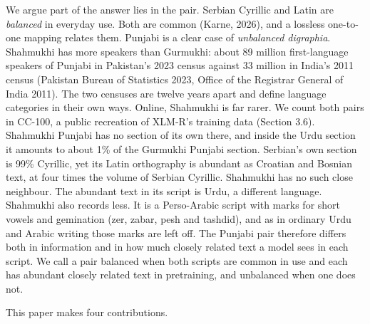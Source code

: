 We argue part of the answer lies in the pair. Serbian Cyrillic and Latin
are \emph{balanced} in everyday use. Both are common (Karne, 2026), and
a lossless one-to-one mapping relates them. Punjabi is a clear case of
\emph{unbalanced digraphia}. Shahmukhi has more speakers than Gurmukhi:
about 89 million first-language speakers of Punjabi in Pakistan's 2023
census against 33 million in India's 2011 census (Pakistan Bureau of
Statistics 2023, Office of the Registrar General of India 2011). The two
censuses are twelve years apart and define language categories in their
own ways. Online, Shahmukhi is far rarer. We count both pairs in CC-100,
a public recreation of XLM-R's training data (Section 3.6). Shahmukhi
Punjabi has no section of its own there, and inside the Urdu section it
amounts to about 1\% of the Gurmukhi Punjabi section. Serbian's own
section is 99\% Cyrillic, yet its Latin orthography is abundant as
Croatian and Bosnian text, at four times the volume of Serbian Cyrillic.
Shahmukhi has no such close neighbour. The abundant text in its script
is Urdu, a different language. Shahmukhi also records less. It is a
Perso-Arabic script with marks for short vowels and gemination (zer,
zabar, pesh and tashdid), and as in ordinary Urdu and Arabic writing
those marks are left off. The Punjabi pair therefore differs both in
information and in how much closely related text a model sees in each
script. We call a pair balanced when both scripts are common in use and
each has abundant closely related text in pretraining, and unbalanced
when one does not.

This paper makes four contributions.

